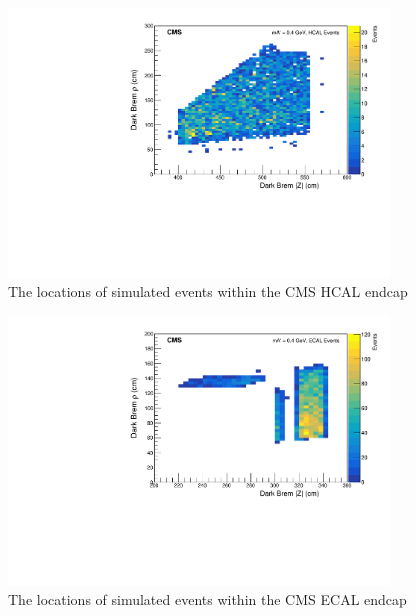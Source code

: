 \begin{figure}[h]
	\includegraphics[width=0.9\textwidth]{figures/HCALbrems.pdf}
	\centering
	\caption{The locations of simulated \dbrem events within the CMS HCAL endcap}
	\label{fig:HEbrems}
\end{figure}

\begin{figure}[h]
	\includegraphics[width=0.9\textwidth]{figures/ECALbrems.pdf}
	\centering
	\caption{The locations of simulated \dbrem events within the CMS ECAL endcap}
	\label{fig:EEbrems}
\end{figure}

